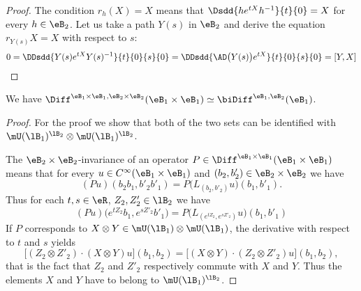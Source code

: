 \begin{proof}
	The condition $r_h(X)=X$ means that $\Dsdd{ h e^{tX}h^{-1} }{t}{0}=X$ for every $h\in\eB_2$. Let us take a path $Y(s)$ in $\eB_2$ and derive the equation $r_{Y(s)}X=X$ with respect to $s$:
	\begin{equation}
			0=\DDsdd{ Y(s) e^{tX}Y(s)^{-1} }{t}{0}{s}{0}=\DDsdd{ \AD\big( Y(s) \big) e^{tX} }{t}{0}{s}{0}=[Y,X]
	\end{equation}
\end{proof}

\begin{lemma}
	We have $\Diff^{\eB_1\times\eB_1,\eB_2\times\eB_2}(\eB_1\times\eB_1)\simeq\biDiff^{\eB_1,\eB_2}(\eB_1)$.
\end{lemma}

\begin{proof}
	For the proof we show that both of the two sets can be identified with $\mU(\lB_1)^{\lB_2}\otimes\mU(\lB_1)^{\lB_2}$. 

	The $\eB_2\times\eB_2$-invariance of an operator $P\in\Diff^{\eB_1\times\eB_1}(\eB_1\times\eB_1)$ means that for every $u\in C^{\infty}(\eB_1\times\eB_1)$ and $(b_2,b'_2)\in\eB_2\times\eB_2$ we have
	\begin{equation}
		(Pu)(b_2b_1,b'_2b'_1)=P\big( L_{(b_2,b'_2)}u \big)(b_1,b'_1).
	\end{equation}
	Thus for each $t,s\in\eR$, $Z_2,Z'_2\in\lB_2$ we have
	\begin{equation}
		(Pu)\big(  e^{tZ_2}b_1, e^{sZ'_2}b'_1 \big)=P\big( L_{( e^{tZ_2}, e^{sZ'_2})}u \big)(b_1,b'_1)
	\end{equation}
	If $P$ corresponds to $X\otimes Y\in\mU(\lB_1)\otimes\mU(\lB_1)$, the derivative with respect to $t$ and $s$ yields
	\begin{equation}
		\big[ (Z_2\otimes Z'_2)\cdot(X\otimes Y)u \big](b_1,b_2)=\big[ (X\otimes Y)\cdot (Z_2\otimes Z'_2)u \big](b_1,b_2),
	\end{equation}
	that is the fact that $Z_2$ and $Z'_2$ respectively commute with $X$ and $Y$. Thus the elements $X$ and $Y$ have to belong to $\mU(\lB_1)^{\lB_2}$.


\end{proof}
